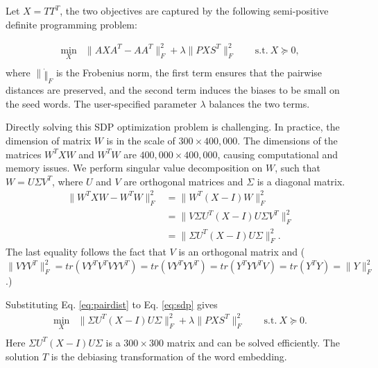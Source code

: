 \documentclass{article}
\begin{document}
Let $X = TT^T$, the two objectives are captured by the following semi-positive definite programming 
problem:

\begin{equation}
\label{eq:sdp1}
\begin{split}
\min_{X} & \| AXA^T-AA^T \|_F^2 + \lambda \|PXS^T\|_F^2 \qquad \mbox{s.t.} \ 
 X\succeq 0, \\
\end{split}
\end{equation} 
where $\|\dot \|_F$ is the Frobenius norm,  
the first term ensures that the pairwise distances are preserved, and the second term induces the biases to be small on the seed words.    
The user-specified parameter $\lambda$
balances the two terms.   
\fi


Directly solving this SDP optimization problem
is challenging.   
In practice, the dimension of matrix $W$ is in the scale of $300 \times 400,000$. 
The dimensions of the matrices $W^T XW$ and $W^T W$ are $400,000 \times 400,000$,
causing computational and memory issues.
We perform singular value decomposition on $W$, such that $W=U\Sigma V^T$, where $U$ and $V$ are orthogonal matrices and $\Sigma$ is a diagonal matrix.
\begin{equation}
\label{eq:pairdist}
\begin{split}
\|W^T XW-W^TW\|_F^2 &= \|W^T(X-I)W\|_F^2\\ 
&= \|V\Sigma U^T (X-I) U \Sigma V^T\|_F^2 \\
&=  \|\Sigma U^T (X-I) U \Sigma\|_F^2.
\end{split}
\end{equation}
The last equality follows the fact that $V$ is an orthogonal matrix and ($\|VYV^T\|_F^2 = tr(VY^TV^TVYV^T)=tr(VY^TYV^T) = tr(Y^TYV^TV) = tr(Y^TY) = \|Y\|_F^2$.)

Substituting Eq.  \eqref{eq:pairdist} to Eq. \eqref{eq:sdp} gives 
\begin{equation}
\label{eq:sdp2}
\begin{split}
\min_{X} &  \|\Sigma U^T (X-I) U \Sigma\|_F^2 + \lambda \|PXS^T\|_F^2 \quad\quad 
\mbox{s.t.} \ X\succeq 0. \\
\end{split}
\end{equation}
Here $\Sigma U^T (X-I) U \Sigma$ is a $300 \times 300 $ matrix and can be solved efficiently. The solution $T$ is the  debiasing transformation of the word embedding.
\end{document}

